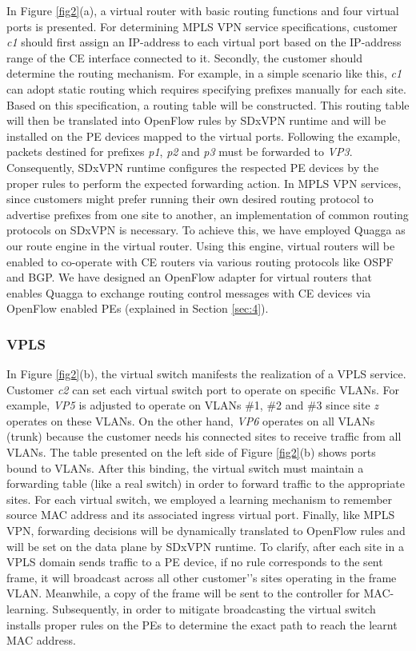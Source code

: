 \documentclass[10pt,conference]{IEEEtran}
\begin{document}
In Figure \ref {fig2}(a), a virtual router with basic routing functions and four virtual ports is presented. For determining MPLS VPN service specifications, customer \textit{c1}  should first assign an IP-address to each virtual port based on the IP-address range of the CE interface connected to it. Secondly, the customer should determine  the routing mechanism.
For example, in a simple scenario like this,  \textit{c1} can adopt static routing which requires
specifying prefixes manually for each site. Based on this specification, a routing table will be constructed. This routing table will then be translated into OpenFlow rules by SDxVPN runtime and will be installed on the PE devices mapped to the virtual ports. Following the example, packets destined for prefixes \textit{p1}, \textit{p2} and \textit{p3} must be forwarded to \textit{VP3}. Consequently, SDxVPN runtime configures the respected PE devices by the proper rules to perform the expected forwarding action.
In MPLS VPN services, since customers might prefer running their own desired routing protocol to advertise prefixes from one site to another, an implementation of common routing protocols on SDxVPN is necessary. To achieve this, we have employed Quagga  \cite{19} as our route engine in the virtual router. Using this engine, virtual routers will be enabled to co-operate with CE routers via various routing protocols like OSPF and BGP. We have designed an OpenFlow adapter for virtual routers that enables Quagga to exchange routing control messages with CE devices via OpenFlow enabled PEs  (explained in Section \ref{sec:4}).
 
\subsubsection {\textbf{VPLS}}

In Figure \ref {fig2}(b), the virtual switch manifests the realization of a VPLS service. Customer \textit{c2} can set each virtual switch port to operate on specific VLANs. For example, \textit{VP5} is adjusted to operate on VLANs \#1, \#2 and \#3 since site \textit{z} operates on these VLANs. On the other hand, \textit{VP6} operates on all VLANs (trunk) because the customer needs his connected sites to receive traffic from all VLANs. The table  presented on the left side of Figure \ref {fig2}(b) shows ports bound to VLANs. After this binding,  the  virtual switch must maintain a forwarding table (like a real switch) in order to forward  traffic  to the appropriate sites. For each virtual switch, we employed a learning mechanism to remember source MAC address and its associated ingress virtual port. Finally, like MPLS VPN, forwarding decisions will be dynamically translated to OpenFlow rules and will be set on the data plane by SDxVPN runtime. To clarify, after each site in a VPLS domain sends traffic to a PE device, if no rule corresponds to the sent frame, it will broadcast across all other customer’'s sites operating in the frame VLAN. Meanwhile, a copy of the frame will be sent to the controller for MAC-learning. Subsequently, in order to mitigate broadcasting the virtual switch installs proper rules on the PEs to determine the exact path to reach the learnt MAC address.
\end{document}
